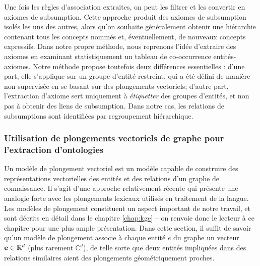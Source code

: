 Une fois les règles d'association extraites, on peut les filtrer et les convertir en axiomes de subsumption. Cette approche produit des axiomes de subsumption isolés les uns des autres, alors qu'on souhaite généralement obtenir une hiérarchie contenant tous les concepts nommés et, éventuellement, de nouveaux concepts expressifs. Dans notre propre méthode, nous reprenons l'idée d'extraire des axiomes en examinant statistiquement un tableau de co-occurrence entités-axiomes. Notre méthode propose toutefois deux différences essentielles : d'une part, elle s'applique sur un groupe d'entité restreint, qui a été défini de manière non supervisée en se basant sur des plongements vectoriels; d'autre part, l'extraction d'axiome sert uniquement à \textit{étiquetter} des groupes d'entités, et non pas à obtenir des liens de subsumption. Dans notre cas, les relations de subsumptions sont identifiées par regroupement hiérarchique.



\subsubsection{Utilisation de plongements vectoriels de graphe pour l'extraction d'ontologies}

Un modèle de plongement vectoriel est un modèle capable de construire des représentations vectorielles des entités et des relations d'un graphe de connaissance. Il s'agit d'une approche relativement récente qui présente une analogie forte avec les plongements lexicaux utilisés en traitement de la langue. Les modèles de plongement constituent un aspect important de notre travail, et sont décrits en détail dans le chapitre \ref{chap:kge} – on renvoie donc le lecteur à ce chapitre pour une plus ample présentation. Dans cette section, il suffit de savoir qu'un modèle de plongement associe à chaque entité $e$ du graphe un vecteur $\textbf{e} \in \mathbb{R}^d$ (plus rarement $\mathbb{C}^d$), de telle sorte que deux entités impliquées dans des relations similaires aient des plongements géométriquement proches.

